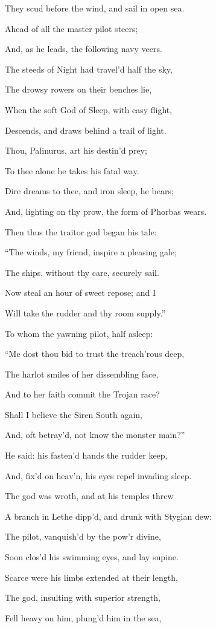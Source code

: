 They scud before the wind, and sail in open sea.

Ahead of all the master pilot steers;

And, as he leads, the following navy veers.

The steeds of Night had travel’d half the sky,

The drowsy rowers on their benches lie,

When the soft God of Sleep, with easy flight,

Descends, and draws behind a trail of light.

Thou, Palinurus, art his destin’d prey;

To thee alone he takes his fatal way.

Dire dreams to thee, and iron sleep, he bears;

And, lighting on thy prow, the form of Phorbas wears.

Then thus the traitor god began his tale:

“The winds, my friend, inspire a pleasing gale;

The ships, without thy care, securely sail.

Now steal an hour of sweet repose; and I

Will take the rudder and thy room supply.”

To whom the yawning pilot, half asleep:

“Me dost thou bid to trust the treach’rous deep,

The harlot smiles of her dissembling face,

And to her faith commit the Trojan race?

Shall I believe the Siren South again,

And, oft betray’d, not know the monster main?”

He said: his fasten’d hands the rudder keep,

And, fix’d on heav’n, his eyes repel invading sleep.

The god was wroth, and at his temples threw

A branch in Lethe dipp’d, and drunk with Stygian dew:

The pilot, vanquish’d by the pow’r divine,

Soon clos’d his swimming eyes, and lay supine.

Scarce were his limbs extended at their length,

The god, insulting with superior strength,

Fell heavy on him, plung’d him in the sea,

